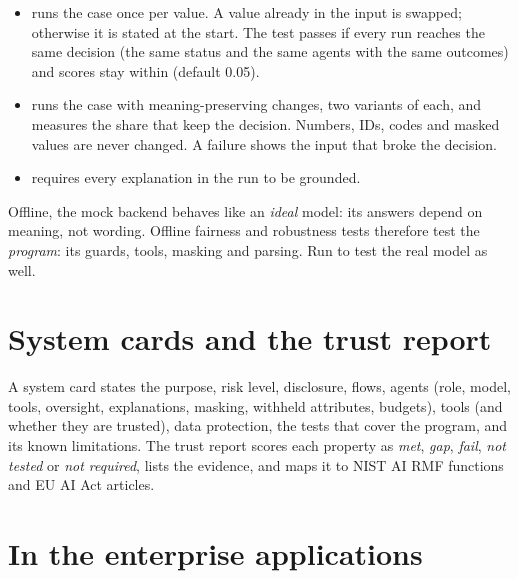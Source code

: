 \begin{itemize}
\item \textbf{} runs the case once per value. A value already in the input is swapped; otherwise it is stated at the start. The test passes if every run reaches the same decision (the same status and the same agents with the same outcomes) and scores stay within  (default 0.05).
\item \textbf{} runs the case with meaning-preserving changes, two variants of each, and measures the share that keep the decision. Numbers, IDs, codes and masked values are never changed. A failure shows the input that broke the decision.
\item \textbf{} requires every explanation in the run to be grounded.
\end{itemize}

\begin{note}
Offline, the mock backend behaves like an \emph{ideal} model: its answers depend on meaning, not wording. Offline fairness and robustness tests therefore test the \emph{program}: its guards, tools, masking and parsing. Run  to test the real model as well.
\end{note}

\section{System cards and the trust report}


A system card states the purpose, risk level, disclosure, flows, agents (role, model, tools, oversight, explanations, masking, withheld attributes, budgets), tools (and whether they are trusted), data protection, the tests that cover the program, and its known limitations. The trust report scores each property as \emph{met}, \emph{gap}, \emph{fail}, \emph{not tested} or \emph{not required}, lists the evidence, and maps it to NIST AI RMF functions and EU AI Act articles.

\section{In the enterprise applications}

